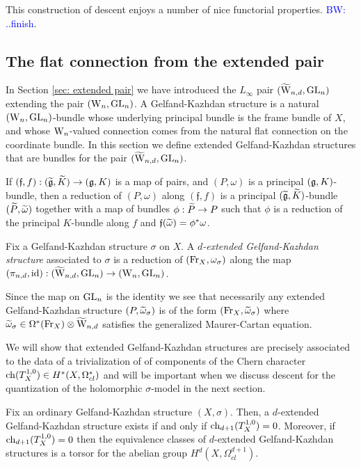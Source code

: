 \documentclass[10pt]{amsart}
\def\brian{\textcolor{blue}{BW: }\textcolor{blue}}
\begin{document}
\begin{rmk} 
This construction of descent enjoys a number of nice functorial properties. \brian{..finish}.
\end{rmk}

\subsection{The flat connection from the extended pair}

In Section \ref{sec: extended pair} we have introduced the $L_\infty$ pair $(\TVectd, \GL_n)$ extending the pair $(\Vect, \GL_n)$.
A Gelfand-Kazhdan structure is a natural $(\Vect,\GL_n)$-bundle whose underlying principal bundle is the frame bundle of $X$, and whose $\Vect$-valued connection comes from the natural flat connection on the coordinate bundle. 
In this section we define extended Gelfand-Kazhdan structures that are bundles for the pair $(\TVectd,\GL_n)$.

If $(\mathfrak{f},f) : (\Tilde{\fg},\Tilde{K}) \to (\fg, K)$ is a map of pairs, and $(P,\omega)$ is a principal $(\fg,K)$-bundle, then a reduction of $(P,\omega)$ along $(\mathfrak{f},f)$ is a principal $(\Tilde{\fg}, \Tilde{K})$-bundle $(\Tilde{P}, \Tilde{\omega})$ together with a map of bundles $\phi : \Tilde{P} \to P$ such that $\phi$ is a reduction of the principal $K$-bundle along $f$ and $\mathfrak{f}(\Tilde{\omega}) = \phi^*\omega$.

\begin{dfn}
Fix a Gelfand-Kazhdan structure $\sigma$ on $X$. 
A {\em $d$-extended Gelfand-Kazhdan structure} associated to $\sigma$ is a reduction of $(\Fr_X, \omega_{\sigma})$ along the map $(\pi_{n,d}, {\rm id}) : (\TVectd,\GL_n) \to (\Vect, \GL_n)$.
\end{dfn}

Since the map on $\GL_n$ is the identity we see that necessarily any extended Gelfand-Kazhdan structure $(P, \Tilde{\omega}_\sigma)$ is of the form $(\Fr_X, \Tilde{\omega}_\sigma)$ where $\Tilde{\omega}_\sigma \in \Omega^*(\Fr_X) \tensor \TVectd$ satisfies the generalized Maurer-Cartan equation.

We will show that extended Gelfand-Kazhdan structures are precisely associated to the data of a trivialization of of components of the Chern character $\ch(T_X^{1,0}) \in H^*(X, \Omega^*_{cl})$ and will be important when we discuss descent for the quantization of the holomorphic $\sigma$-model in the next section.

\begin{prop}
Fix an ordinary Gelfand-Kazhdan structure $(X,\sigma)$.
Then, a $d$-extended Gelfand-Kazhdan structure exists if and only if $\ch_{d+1}(T^{1,0}_X) = 0$.
Moreover, if $\ch_{d+1}(T_X^{1,0}) = 0$ then the equivalence classes of $d$-extended Gelfand-Kazhdan structures is a torsor for the abelian group $H^{d}(X , \Omega^{d+1}_{cl})$.
\end{prop}
\end{document}

